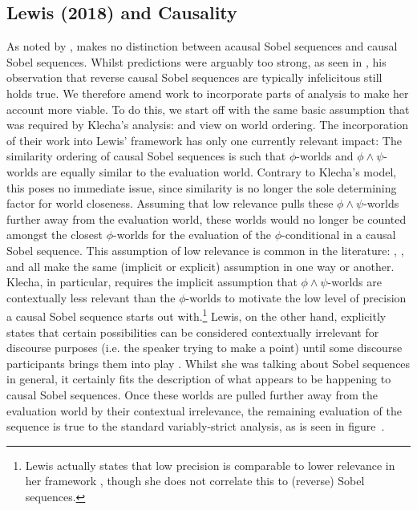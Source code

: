 \subsection{Lewis (2018) and Causality}
As noted by \textcite{Krassnig2017}, \textcite{Lewis2018} makes no distinction between acausal Sobel sequences and causal Sobel sequences. Whilst  predictions were arguably too strong, as seen in , his observation that reverse causal Sobel sequences are typically infelicitous still holds true. We therefore amend  work to incorporate parts of  analysis to make her account more viable. To do this, we start off with the same basic assumption that was required by Klecha's analysis: \textcite{Bennett2003} and  view on world ordering. The incorporation of their work into Lewis' framework has only one currently relevant impact: The similarity ordering of causal Sobel sequences is such that $\phi$-worlds and $\phi\land\psi$-worlds are equally similar to the evaluation world. Contrary to Klecha's model, this poses no immediate issue, since similarity is no longer the sole determining factor for world closeness. Assuming that low relevance pulls these $\phi\land\psi$-worlds further away from the evaluation world, these worlds would no longer be counted amongst the closest $\phi$-worlds for the evaluation of the $\phi$-conditional in a causal Sobel sequence. This assumption of low relevance is common in the literature: \textcite{Moss2012}, \textcite{Klecha2014,Klecha2015}, and \textcite{Lewis2018} all make the same (implicit or explicit) assumption in one way or another. Klecha, in particular, requires the implicit assumption that $\phi\land\psi$-worlds are contextually less relevant than the $\phi$-worlds to motivate the low level of precision a causal Sobel sequence starts out with.\footnote{Lewis actually states that low precision is comparable to lower relevance in her framework \parencite[p. 500]{Lewis2018}, though she does not correlate this to (reverse) Sobel sequences.} Lewis, on the other hand, explicitly states that certain possibilities can be considered contextually irrelevant for discourse purposes (i.e. the speaker trying to make a point) until some discourse participants brings them into play \parencite[p. 501]{Lewis2018}. Whilst she was talking about Sobel sequences in general, it certainly fits the description of what appears to be happening to causal Sobel sequences. Once these worlds are pulled further away from the evaluation world by their contextual irrelevance, the remaining evaluation of the sequence is true to the standard variably-strict analysis, as is seen in figure~.%
